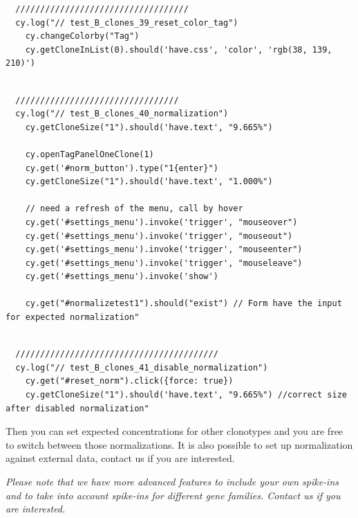 \begin{verbatim}
  ///////////////////////////////////
  cy.log("// test_B_clones_39_reset_color_tag")
    cy.changeColorby("Tag")
    cy.getCloneInList(0).should('have.css', 'color', 'rgb(38, 139, 210)')


\end{verbatim}

\begin{verbatim}
  /////////////////////////////////
  cy.log("// test_B_clones_40_normalization")
    cy.getCloneSize("1").should('have.text', "9.665%")

    cy.openTagPanelOneClone(1)
    cy.get('#norm_button').type("1{enter}")
    cy.getCloneSize("1").should('have.text', "1.000%")

    // need a refresh of the menu, call by hover
    cy.get('#settings_menu').invoke('trigger', "mouseover")
    cy.get('#settings_menu').invoke('trigger', "mouseout")
    cy.get('#settings_menu').invoke('trigger', "mouseenter")
    cy.get('#settings_menu').invoke('trigger', "mouseleave")
    cy.get('#settings_menu').invoke('show')

    cy.get("#normalizetest1").should("exist") // Form have the input for expected normalization"


\end{verbatim}

\begin{verbatim}
  /////////////////////////////////////////
  cy.log("// test_B_clones_41_disable_normalization")
    cy.get("#reset_norm").click({force: true})
    cy.getCloneSize("1").should('have.text', "9.665%") //correct size after disabled normalization"

\end{verbatim}

Then you can set expected concentrations for other clonotypes and you are free to
switch between those normalizations.
It is also possible to set up normalization against external data,
contact us if you are interested.

\textit{Please note that we have more advanced features to include your own spike-ins and to take into account spike-ins for different gene families. Contact us if you are interested.}
